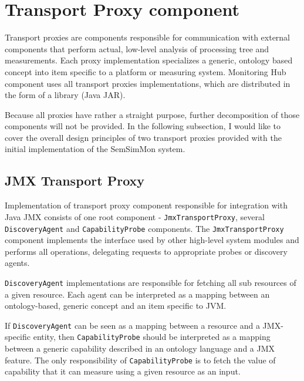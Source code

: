 %
\section{Transport Proxy component}
\label{sec:arch_tproxy}

Transport proxies are components responsible for communication with external components that perform actual, low-level analysis of processing tree and measurements. Each proxy implementation specializes a generic, ontology based concept into item specific to a platform or measuring system. Monitoring Hub component uses all transport proxies implementations, which are distributed in the form of a library (Java JAR).

Because all proxies have rather a straight purpose, further decomposition of those components will not be provided. In the following subsection, I would like to cover the overall design principles of two transport proxies provided with the initial implementation of the SemSimMon system.

\subsection{JMX Transport Proxy}

Implementation of transport proxy component responsible for integration with Java JMX consists of one root component - \texttt{JmxTransportProxy}, several \texttt{DiscoveryAgent} and \texttt{CapabilityProbe} components. The \texttt{JmxTransportProxy} component implements the interface used by other high-level system modules and performs all operations, delegating requests to appropriate probes or discovery agents.

\texttt{DiscoveryAgent} implementations are responsible for fetching all sub resources of a given resource. Each agent can be interpreted as a mapping between an ontology-based, generic concept and an item specific to JVM. 

If \texttt{DiscoveryAgent} can be seen as a mapping between a resource and a JMX-specific entity, then \texttt{CapabilityProbe} should be interpreted as a mapping between a generic capability described in an ontology language and a JMX feature. The only responsibility of \texttt{CapabilityProbe} is to fetch the value of capability that it can measure using a given resource as an input.

